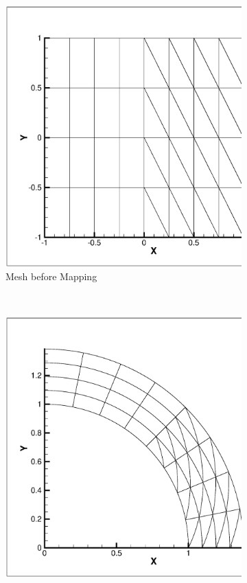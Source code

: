 \documentclass[12pt,Bold,letterpaper,TexShade]{mcgilletdclass}
\numberwithin{equation}{section}
\begin{document}
\begin{figure}
    \centering
    \begin{subfigure}[b]{0.45\textwidth}
        \includegraphics[width=\textwidth]{./figures/StructuredMixedML1P4_ToBeCurved.eps}
        \caption{Mesh before Mapping}
    \end{subfigure}
    ~
    \begin{subfigure}[b]{0.45\textwidth}
        \includegraphics[width=\textwidth]{./figures/StructuredMixedML1P4_Curved.eps}

\end{subfigure}
\end{figure}
\end{document}
